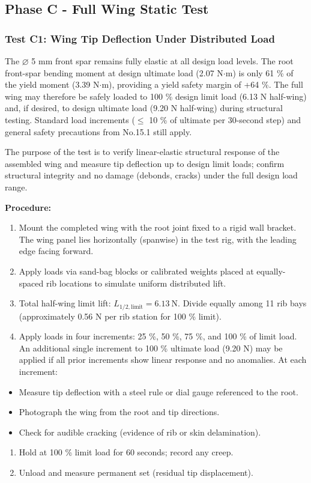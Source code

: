 \documentclass[10pt,a4paper]{article}
\begin{document}
\subsection{Phase C - Full Wing Static Test}

\subsubsection{Test C1: Wing Tip Deflection Under Distributed Load}

The $\varnothing$ 5 mm front spar remains fully elastic at all design load levels. The root front-spar bending moment at design ultimate load (2.07 N${\cdot}$m) is only 61 \% of the yield moment (3.39 N${\cdot}$m), providing a yield safety margin of +64 \%. The full wing may therefore be safely loaded to 100 \% design limit load (6.13 N half-wing) and, if desired, to design ultimate load (9.20 N half-wing) during structural testing. Standard load increments (${\leq}$ 10 \% of ultimate per 30-second step) and general safety precautions from No.15.1 still apply.

The purpose of the test is to verify linear-elastic structural response of the assembled wing and measure tip deflection up to design limit loads; confirm structural integrity and no damage (debonds, cracks) under the full design load range.

\textbf{Procedure:}
\begin{enumerate}[noitemsep,topsep=2pt]
\item Mount the completed wing with the root joint fixed to a rigid wall bracket. The wing panel lies horizontally (spanwise) in the test rig, with the leading edge facing forward.
\item Apply loads via sand-bag blocks or calibrated weights placed at equally-spaced rib locations to simulate uniform distributed lift.
\item Total half-wing limit lift: $L_{1/2,\text{limit}} = 6.13\ \text{N}$. Divide equally among 11 rib bays (approximately 0.56 N per rib station for 100 \% limit).
\item Apply loads in four increments: 25 \%, 50 \%, 75 \%, and 100 \% of limit load. An additional single increment to 100 \% ultimate load (9.20 N) may be applied if all prior increments show linear response and no anomalies. At each increment:
\end{enumerate}
\begin{itemize}[noitemsep,topsep=2pt]
\item Measure tip deflection with a steel rule or dial gauge referenced to the root.
\item Photograph the wing from the root and tip directions.
\item Check for audible cracking (evidence of rib or skin delamination).
\end{itemize}
\begin{enumerate}[noitemsep,topsep=2pt]
\item Hold at 100 \% limit load for 60 seconds; record any creep.
\item Unload and measure permanent set (residual tip displacement).
\end{enumerate}
\end{document}
